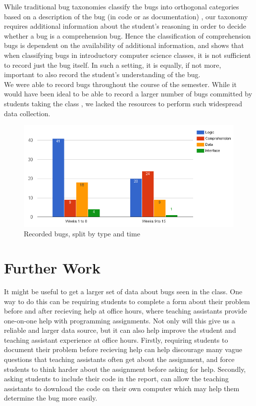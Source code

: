 \documentclass{sig-alternate}
\begin{document}
While traditional bug taxonomies classify the bugs into orthogonal categories based on a description of the bug (in code or as documentation) \cite{Beizer90}, our taxonomy requires additional information about the student's reasoning in order to decide whether a bug is a comprehension bug. Hence the classification of comprehension bugs is dependent  on the availability of additional information, and shows that when classifying bugs in introductory computer science classes, it is not sufficient to record just the bug itself. In such a setting, it is equally, if not more, important to also record the student's understanding of the bug.\\

We were able to record \numtotal bugs throughout the course of the semester. While it would have been ideal to be able to record a larger number of bugs committed by students taking the class \cite{BryceCooleyHansenHayrapetyan10}, we lacked the resources to perform such widespread data collection.

\begin{figure}
\centering
\includegraphics[scale=0.38]{figures/types.png}
\caption{Recorded bugs, split by type and time}
\label{fig:types}
\end{figure}


\section{Further Work}
It might be useful to get a larger set of data about bugs seen in the class. One way to do this can be requiring students to complete a form about their problem before and after recieving help at office hours, where teaching assistants provide one-on-one help with programming assignments. Not only will this give us a reliable and larger data source, but it can also help improve the student and teaching assistant experience at office hours. Firstly, requiring students to document their problem before recieving help can help discourage many vague questions that teaching assistants often get about the assignment, and force students to think harder about the assignment before asking for help. Secondly, asking students to include their code in the report, can allow the teaching assistants to download the code on their own computer which may help them determine the bug more easily.\\
\end{document}
